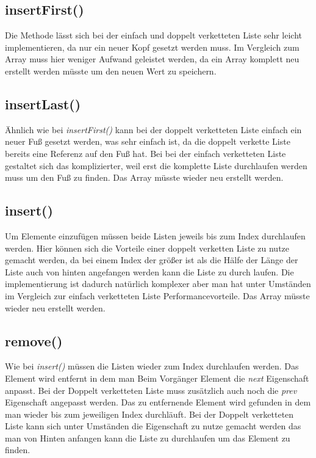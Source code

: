 \documentclass[a4paper, 11pt]{article}
\begin{document}
\subsection*{insertFirst()}
Die Methode lässt sich bei der einfach und doppelt verketteten Liste sehr leicht implementieren, da nur ein neuer Kopf
gesetzt werden muss. Im Vergleich zum Array muss hier weniger Aufwand geleistet werden, da ein Array komplett neu
erstellt werden müsste um den neuen Wert zu speichern.

\subsection*{insertLast()}

Ähnlich wie bei \textit{insertFirst()} kann bei der doppelt verketteten Liste einfach ein neuer Fuß gesetzt werden, was
sehr einfach ist, da die doppelt verkette Liste bereits eine Referenz auf den Fuß hat. Bei bei der einfach verketteten
Liste gestaltet sich das komplizierter, weil erst die komplette Liste durchlaufen werden muss um den Fuß zu finden.
Das Array müsste wieder neu erstellt werden.

\subsection*{insert()}

Um Elemente einzufügen müssen beide Listen jeweils bis zum Index durchlaufen werden. Hier können sich die Vorteile einer
doppelt verketten Liste zu nutze gemacht werden, da bei einem Index der größer ist als die Hälfe der Länge der Liste auch
von hinten angefangen werden kann die Liste zu durch laufen. Die implementierung ist dadurch natürlich komplexer aber
man hat unter Umständen im Vergleich zur einfach verketteten Liste Performancevorteile. Das Array müsste wieder neu
erstellt werden.


\subsection*{remove()}
Wie bei \textit{insert()} müssen die Listen wieder zum Index durchlaufen werden. Das Element wird entfernt in dem man
Beim Vorgänger Element die \textit{next} Eigenschaft anpasst. Bei der Doppelt verketteten Liste muss zusätzlich auch
noch die \textit{prev} Eigenschaft angepasst werden. Das zu entfernende Element wird gefunden in dem man wieder bis zum
jeweiligen Index durchläuft. Bei der Doppelt verketteten Liste kann sich unter Umständen die Eigenschaft zu nutze
gemacht werden das man von Hinten anfangen kann die Liste zu durchlaufen um das Element zu finden.
\end{document}
